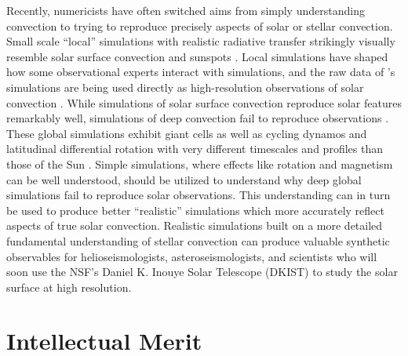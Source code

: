 \documentclass[11pt, preprint]{aastex}
\begin{document}
Recently, numericists have often switched aims from simply understanding convection to trying to reproduce precisely aspects of solar or stellar convection.
Small scale ``local'' simulations with realistic radiative transfer strikingly visually resemble solar surface convection and sunspots \citep{stein&nordlund1998, rempel&all2009, stein&nordlund2012, rempel2014}.
Local simulations have shaped how some observational experts interact with simulations, and the raw data of \citet{rempel2014}'s simulations are being used directly as high-resolution observations of solar convection \citep[see e.g.,][and others]{vankooten&cranmer2017, shchukina&trujillo2019}.
While simulations of solar surface convection reproduce solar features remarkably well, simulations of deep convection fail to reproduce observations  \citep{hanasoge&all2015}.
These global simulations exhibit giant cells as well as cycling dynamos and latitudinal differential rotation with very different timescales and profiles than those of the Sun \citep{brown&all2010, brown&all2011, guerrero&all2016, hotta&all2016, brun&all2017, strugarek&all2018}.
Simple simulations, where effects like rotation and magnetism can be well understood, should be utilized to understand why deep global simulations fail to reproduce solar observations.
This understanding can in turn be used to produce better ``realistic'' simulations which more accurately reflect aspects of true solar convection.
Realistic simulations built on a more detailed fundamental understanding of stellar convection can produce valuable synthetic observables for helioseismologists, asteroseismologists, and scientists who will soon use the NSF's Daniel K. Inouye Solar Telescope (DKIST) to study the solar surface at high resolution.


\section{Intellectual Merit}
\vspace{-11pt}

\label{sct:intellectual_merit}
\end{document}
